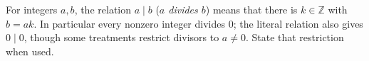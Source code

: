 
For integers $a,b$, the relation $a\mid b$ (\emph{$a$ divides $b$}) means that there is $k\in\mathbb Z$ with $b=ak$. In particular every nonzero integer divides $0$; the literal relation also gives $0\mid0$, though some treatments restrict divisors to $a\ne0$. State that restriction when used.
